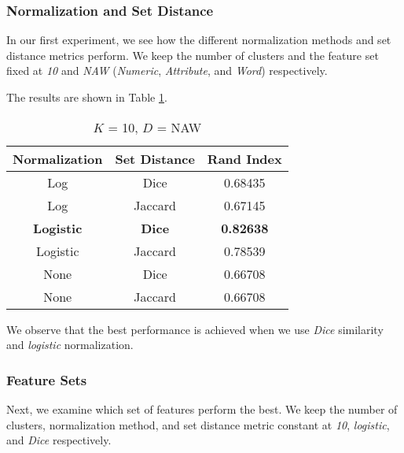 \documentclass{article}
\begin{document}
      \subsubsection{Normalization and Set Distance}
         In our first experiment, we see how the different normalization methods and set distance metrics perform.
         We keep the number of clusters and the feature set fixed at \textit{10} and \textit{NAW} (\textit{Numeric}, \textit{Attribute}, and \textit{Word}) respectively.

         The results are shown in Table \ref{tab:func}. 
         \begin{table}
            \begin{center}
               \begin{tabular}{| c | c | c |}
                  \hline
                     Normalization & Set Distance & Rand Index \\
                  \hline
                     Log & Dice & 0.68435 \\
                     Log & Jaccard & 0.67145 \\
                     \textbf{Logistic} & \textbf{Dice} & \textbf{0.82638} \\
                     Logistic & Jaccard & 0.78539 \\
                     None & Dice & 0.66708 \\
                     None & Jaccard & 0.66708 \\
                  \hline
               \end{tabular}
               \caption{$K$ = 10, $D$ = NAW}
               \label{tab:func}
            \end{center}
         \end{table}

         We observe that the best performance is achieved when we use \textit{Dice} similarity and \textit{logistic} normalization.

      \subsubsection{Feature Sets}
         Next, we examine which set of features perform the best.
         We keep the number of clusters, normalization method, and set distance metric constant at \textit{10}, \textit{logistic}, and \textit{Dice} respectively.
\end{document}
